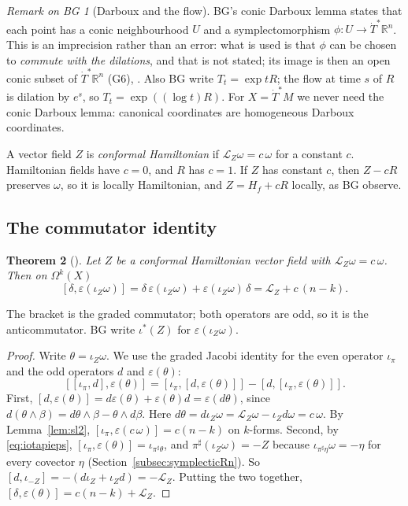 \documentclass[11pt,oneside,reqno]{article}
\newcommand{\R}{\mathbb R}
\newcommand{\Om}{\Omega}
\newcommand{\Tdot}{\dot T^*}
\newcommand{\eps}{\varepsilon}
\newcommand{\Lie}{\mathcal L}
\theoremstyle{plain}
\newtheorem{theorem}{Theorem}[section]
\theoremstyle{definition}
\theoremstyle{remark}
\newtheorem{bgremark}[theorem]{Remark on BG}
\begin{document}
\begin{bgremark}[Darboux and the flow]\label{rem:darboux}
BG's conic Darboux lemma states that each point has a conic neighbourhood \(U\)
and a symplectomorphism \(\phi:U\to\Tdot\R^n\). This is an imprecision rather than an
error: what is used is that \(\phi\) can be chosen to \emph{commute with the dilations},
and that is not stated; its image is then an open conic subset of \(\Tdot\R^n\) (G6),
\cite[\S21.1]{Hormander3}. Also BG write \(T_t=\exp tR\); the flow at time \(s\) of \(R\) is
dilation by \(e^s\), so \(T_t=\exp((\log t)R)\). For \(X=\Tdot M\) we never need
the conic Darboux lemma: canonical coordinates are homogeneous Darboux
coordinates.
\end{bgremark}

A vector field \(Z\) is \emph{conformal Hamiltonian} if \(\Lie_Z\omega=c\,\omega\) for a
constant \(c\). Hamiltonian fields have \(c=0\), and \(R\) has \(c=1\). If \(Z\) has
constant \(c\), then \(Z-cR\) preserves \(\omega\), so it is locally Hamiltonian, and
\(Z=H_f+cR\) locally, as BG observe.

\subsection{The commutator identity}\label{subsec:commid}

\begin{theorem}[{\cite[\S2]{BG}}]\label{thm:commid}
Let \(Z\) be a conformal Hamiltonian vector field with \(\Lie_Z\omega=c\,\omega\). Then on
\(\Om^k(X)\)
\[
 [\delta,\eps(\iota_Z\omega)]=\delta\,\eps(\iota_Z\omega)+\eps(\iota_Z\omega)\,\delta=\Lie_Z+c\,(n-k).
\]
\end{theorem}

The bracket is the graded commutator; both operators are odd, so it is the
anticommutator. BG write \(\iota^*(Z)\) for \(\eps(\iota_Z\omega)\).

\begin{proof}
Write \(\theta=\iota_Z\omega\). We use the graded Jacobi identity for the even operator
\(\iota_\pi\) and the odd operators \(d\) and \(\eps(\theta)\):
\[
 [[\iota_\pi,d],\eps(\theta)]=[\iota_\pi,[d,\eps(\theta)]]-[d,[\iota_\pi,\eps(\theta)]].
\]
First, \([d,\eps(\theta)]=d\eps(\theta)+\eps(\theta)d=\eps(d\theta)\), since
\(d(\theta\wedge\beta)=d\theta\wedge\beta-\theta\wedge d\beta\). Here \(d\theta=d\iota_Z\omega=\Lie_Z\omega-
\iota_Zd\omega=c\,\omega\). By Lemma~\ref{lem:sl2}, \([\iota_\pi,\eps(c\,\omega)]=c(n-k)\) on
\(k\)-forms. Second, by \eqref{eq:iotapieps},
\([\iota_\pi,\eps(\theta)]=\iota_{\pi^\sharp\theta}\), and \(\pi^\sharp(\iota_Z\omega)=-Z\) because
\(\iota_{\pi^\sharp\eta}\omega=-\eta\) for every covector \(\eta\)
(Section~\ref{subsec:symplecticRn}). So \([d,\iota_{-Z}]=-(d\iota_Z+\iota_Zd)=-\Lie_Z\).
Putting the two together, \([\delta,\eps(\theta)]=c(n-k)+\Lie_Z\).
\end{proof}
\end{document}
